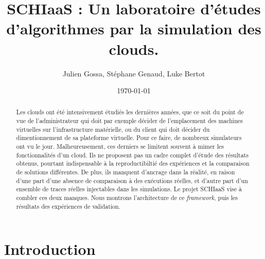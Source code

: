 \documentclass[parallelisme]{compas2017}
\begin{document}
\title{SCHIaaS : Un laboratoire d'études d'algorithmes par la simulation des clouds.}

\author{Julien Gossa, Stéphane Genaud, Luke Bertot}%

\address{Université De Strasbourg,\\
Laboratoire ICube - Pôle API - 300 Bd Sébastien Brant\\
67400 Illkirch-Graffenstaden - France\\
julien.gossa@unistra.fr genaud@unistra.fr lbertot@unistra.fr}

\date{\today}

\maketitle

\begin{abstract}

Les clouds ont été intensivement étudiés les dernières années, que ce soit du 
point de vue de l'administrateur qui doit par exemple décider de l'emplacement
des machines virtuelles sur l'infrastructure matérielle, ou du client qui doit 
décider du dimentionnement de sa plateforme virtuelle. Pour ce faire, de nombreux
simulateurs ont vu le jour. Malheureusement, ces derniers se limitent souvent à 
mimer les fonctionnalités d'un cloud. Ils ne proposent pas un cadre complet d'étude
des résultats obtenus, pourtant indispensable à la reproductibiltié des expériences
et la comparaison de solutions différentes. De plus, ils manquent d'ancrage dans la 
réalité, en raison d'une part d'une absence de comparaison à des exécutions réelles, 
et d'autre part d'un ensemble de traces réelles injectables dans les simulations.
Le projet SCHIaaS vise à combler ces deux manques. Nous montrons l'architecture de 
ce \textit{framework}, puis les résultats des expériences de validation.

\end{abstract}


\section{Introduction}
\end{document}
